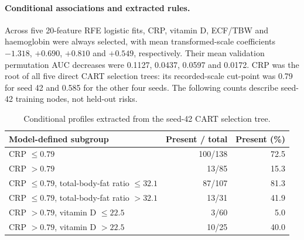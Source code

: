\paragraph{Conditional associations and extracted rules.}
Across five 20-feature RFE logistic fits, CRP, vitamin D, ECF/TBW and
haemoglobin were always selected, with mean transformed-scale coefficients
$-1.318$, $+0.690$, $+0.810$ and $+0.549$, respectively. Their mean validation
permutation AUC decreases were 0.1127, 0.0437, 0.0597 and 0.0172.
CRP was the root of all five direct CART selection trees: its recorded-scale
cut-point was 0.79 for seed 42 and 0.585 for the other four seeds.
The following counts describe seed-42 training nodes, not held-out risks.
\begin{table}[htbp]
\centering
\small
\caption{Conditional profiles extracted from the seed-42 CART selection tree.}
\label{tab:clinical-tree-patterns}
\begin{tabularx}{\textwidth}{Xrr}
\toprule
Model-defined subgroup & Present / total & Present (\%) \\
\midrule
CRP $\leq0.79$ & 100/138 & 72.5 \\
CRP $>0.79$ & 13/85 & 15.3 \\
CRP $\leq0.79$, total-body-fat ratio $\leq32.1$ & 87/107 & 81.3 \\
CRP $\leq0.79$, total-body-fat ratio $>32.1$ & 13/31 & 41.9 \\
CRP $>0.79$, vitamin D $\leq22.5$ & 3/60 & 5.0 \\
CRP $>0.79$, vitamin D $>22.5$ & 10/25 & 40.0 \\
\bottomrule
\end{tabularx}
\end{table}